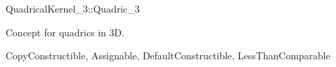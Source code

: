 
\begin{ccRefConcept}{QuadricalKernel_3::Quadric_3}

Concept for quadrics in 3D.

\ccRefines
CopyConstructible, Assignable, DefaultConstructible, LessThanComparable


\end{ccRefConcept}
